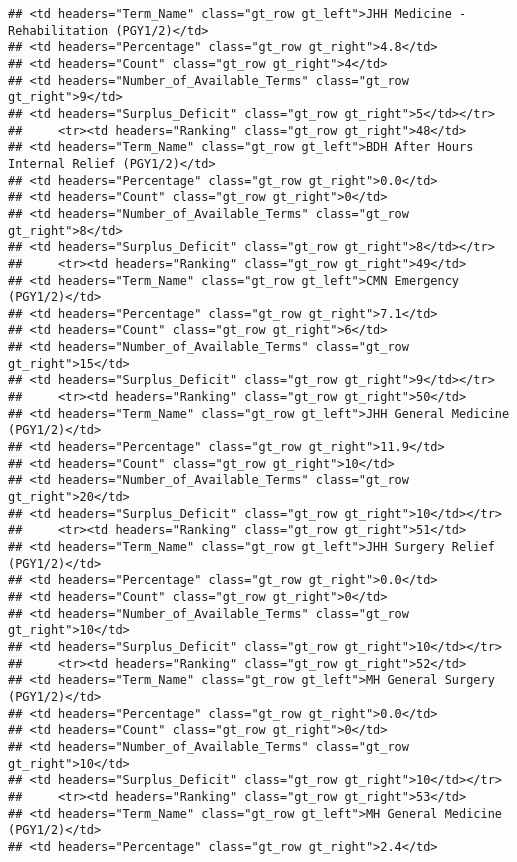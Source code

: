 \documentclass[
]{article}
\begin{document}
\begin{verbatim}
## <td headers="Term_Name" class="gt_row gt_left">JHH Medicine - Rehabilitation (PGY1/2)</td>
## <td headers="Percentage" class="gt_row gt_right">4.8</td>
## <td headers="Count" class="gt_row gt_right">4</td>
## <td headers="Number_of_Available_Terms" class="gt_row gt_right">9</td>
## <td headers="Surplus_Deficit" class="gt_row gt_right">5</td></tr>
##     <tr><td headers="Ranking" class="gt_row gt_right">48</td>
## <td headers="Term_Name" class="gt_row gt_left">BDH After Hours Internal Relief (PGY1/2)</td>
## <td headers="Percentage" class="gt_row gt_right">0.0</td>
## <td headers="Count" class="gt_row gt_right">0</td>
## <td headers="Number_of_Available_Terms" class="gt_row gt_right">8</td>
## <td headers="Surplus_Deficit" class="gt_row gt_right">8</td></tr>
##     <tr><td headers="Ranking" class="gt_row gt_right">49</td>
## <td headers="Term_Name" class="gt_row gt_left">CMN Emergency (PGY1/2)</td>
## <td headers="Percentage" class="gt_row gt_right">7.1</td>
## <td headers="Count" class="gt_row gt_right">6</td>
## <td headers="Number_of_Available_Terms" class="gt_row gt_right">15</td>
## <td headers="Surplus_Deficit" class="gt_row gt_right">9</td></tr>
##     <tr><td headers="Ranking" class="gt_row gt_right">50</td>
## <td headers="Term_Name" class="gt_row gt_left">JHH General Medicine (PGY1/2)</td>
## <td headers="Percentage" class="gt_row gt_right">11.9</td>
## <td headers="Count" class="gt_row gt_right">10</td>
## <td headers="Number_of_Available_Terms" class="gt_row gt_right">20</td>
## <td headers="Surplus_Deficit" class="gt_row gt_right">10</td></tr>
##     <tr><td headers="Ranking" class="gt_row gt_right">51</td>
## <td headers="Term_Name" class="gt_row gt_left">JHH Surgery Relief (PGY1/2)</td>
## <td headers="Percentage" class="gt_row gt_right">0.0</td>
## <td headers="Count" class="gt_row gt_right">0</td>
## <td headers="Number_of_Available_Terms" class="gt_row gt_right">10</td>
## <td headers="Surplus_Deficit" class="gt_row gt_right">10</td></tr>
##     <tr><td headers="Ranking" class="gt_row gt_right">52</td>
## <td headers="Term_Name" class="gt_row gt_left">MH General Surgery (PGY1/2)</td>
## <td headers="Percentage" class="gt_row gt_right">0.0</td>
## <td headers="Count" class="gt_row gt_right">0</td>
## <td headers="Number_of_Available_Terms" class="gt_row gt_right">10</td>
## <td headers="Surplus_Deficit" class="gt_row gt_right">10</td></tr>
##     <tr><td headers="Ranking" class="gt_row gt_right">53</td>
## <td headers="Term_Name" class="gt_row gt_left">MH General Medicine (PGY1/2)</td>
## <td headers="Percentage" class="gt_row gt_right">2.4</td>

\end{verbatim}
\end{document}
